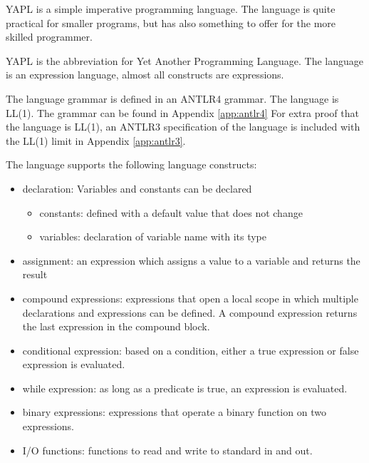 YAPL is a simple imperative programming language. The language is quite practical for smaller programs, but has also something to offer for the more skilled programmer.


YAPL is the abbreviation for Yet Another Programming Language. The language is an expression language, almost all constructs are expressions.

The language grammar is defined in an ANTLR4 grammar. The language is LL(1). The grammar can be found in Appendix \ref{app:antlr4} For extra proof that the language is LL(1), an ANTLR3 specification of the language is included with the LL(1) limit in Appendix \ref{app:antlr3}. 

The language supports the following language constructs:

\begin{itemize}
\item declaration: Variables and constants can be declared
\begin{itemize}
\item constants: defined with a default value that does not change
\item variables: declaration of variable name with its type
\end{itemize}
\item assignment: an expression which assigns a value to a variable and returns the result
\item compound expressions: expressions that open a local scope in which multiple declarations and expressions can be defined. A compound expression returns the last expression in the compound block.
\item conditional expression: based on a condition, either a true expression or false expression is evaluated.
\item while expression: as long as a predicate is true, an expression is evaluated.
\item binary expressions: expressions that operate a binary function on two expressions.
\item I/O functions: functions to read and write to standard in and out.
\end{itemize}